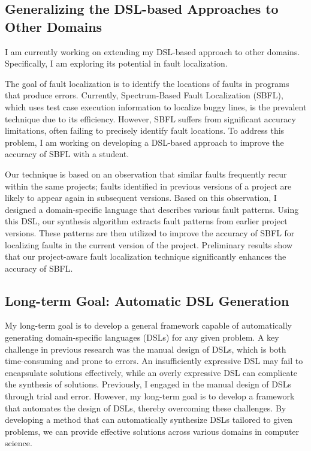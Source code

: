 \documentclass[11pt]{article}
\newcommand{\myparagraph}[1]{\medskip\noindent{\it \textbf{#1.}}}
\begin{document}
\subsection{Generalizing the DSL-based Approaches to Other Domains}
I am currently working on extending my DSL-based approach to other domains.
%
Specifically, I am exploring its potential in fault localization. 



\myparagraph{Generalization to Fault Localization}
The goal of fault localization is to identify the locations of faults in programs that produce errors.
%
Currently, Spectrum-Based Fault Localization (SBFL), which uses test case execution information to localize buggy lines, is the prevalent technique due to its efficiency. 
%
However, SBFL suffers from significant accuracy limitations, often failing to precisely identify fault locations. 
%
To address this problem, I am working on developing a DSL-based approach to improve the accuracy of SBFL with a student.




Our technique is based on an observation that similar faults frequently recur within the same projects; faults identified in previous versions of a project are likely to appear again in subsequent versions.
%
Based on this observation, I designed a domain-specific language that describes various fault patterns.
%
Using this DSL, our synthesis algorithm extracts fault patterns from earlier project versions. 
%
These patterns are then utilized to improve the accuracy of SBFL for localizing faults in the current version of the project.
%
Preliminary results show that our project-aware fault localization technique significantly enhances the accuracy of SBFL.

%





\subsection{Long-term Goal: Automatic DSL Generation}
My long-term goal is to develop a general framework capable of automatically generating domain-specific languages (DSLs) for any given problem.
%
A key challenge in previous research was the manual design of DSLs, which is both time-consuming and prone to errors. 
%
An insufficiently expressive DSL may fail to encapsulate solutions effectively, while an overly expressive DSL can complicate the synthesis of solutions.
%
Previously, I engaged in the manual design of DSLs through trial and error.
%
However, my long-term goal is to develop a framework that automates the design of DSLs, thereby overcoming these challenges.
%
By developing a method that can automatically synthesize DSLs tailored to given problems, we can provide effective solutions across various domains in computer science.






\end{document}
